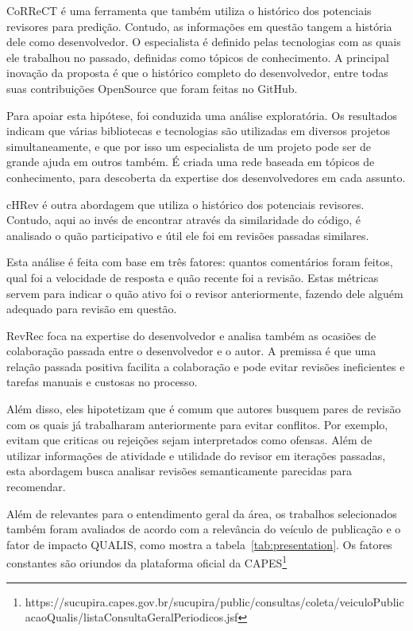 \documentclass[a4paper,12pt]{monografia}
\theoremstyle{plain}
\theoremstyle{definition}
\theoremstyle{remark}
\begin{document}
CoRReCT \cite{rahman2016} é uma ferramenta que também utiliza o histórico dos potenciais revisores para predição. Contudo, as informações em questão tangem a história dele como desenvolvedor. O especialista é definido pelas tecnologias com as quais ele trabalhou no passado, definidas como tópicos de conhecimento. A principal inovação da proposta é que o histórico completo do desenvolvedor, entre todas suas contribuições OpenSource que foram feitas no GitHub.

Para apoiar esta hipótese, foi conduzida uma análise exploratória. Os resultados indicam que várias bibliotecas e tecnologias são utilizadas em diversos projetos simultaneamente, e que por isso um especialista de um projeto pode ser de grande ajuda em outros também. É criada uma rede baseada em tópicos de conhecimento, para descoberta da expertise dos desenvolvedores em cada assunto.


cHRev \cite{zanjani2016} é outra abordagem que utiliza o histórico dos potenciais revisores. Contudo, aqui ao invés de encontrar através da similaridade do código, é analisado o quão participativo e útil ele foi em revisões passadas similares.

Esta análise é feita com base em três fatores: quantos comentários foram feitos, qual foi a velocidade de resposta e quão recente foi a revisão. Estas métricas servem para indicar o quão ativo foi o revisor anteriormente, fazendo dele alguém adequado para revisão em questão.

RevRec \cite{ouni2016} foca na expertise do desenvolvedor e analisa também as ocasiões de colaboração passada entre o desenvolvedor e o autor. A premissa é que uma relação passada positiva facilita a colaboração e pode evitar revisões ineficientes e tarefas manuais e custosas no processo.

Além disso, eles hipotetizam que é comum que autores busquem pares de revisão com os quais já trabalharam anteriormente para evitar conflitos. Por exemplo, evitam que criticas ou rejeições sejam interpretados como ofensas. Além de utilizar informações de atividade e utilidade do revisor em iterações passadas, esta abordagem busca analisar revisões semanticamente parecidas para recomendar.


Além de relevantes para o entendimento geral da área, os trabalhos selecionados também foram avaliados de acordo com a relevância do veículo de publicação e o fator de impacto QUALIS, como mostra a tabela~\ref{tab:presentation}. Os fatores constantes são oriundos da plataforma oficial da CAPES\footnote{https://sucupira.capes.gov.br/sucupira/public/consultas/coleta/veiculoPublicacaoQualis/listaConsultaGeralPeriodicos.jsf}
\end{document}
